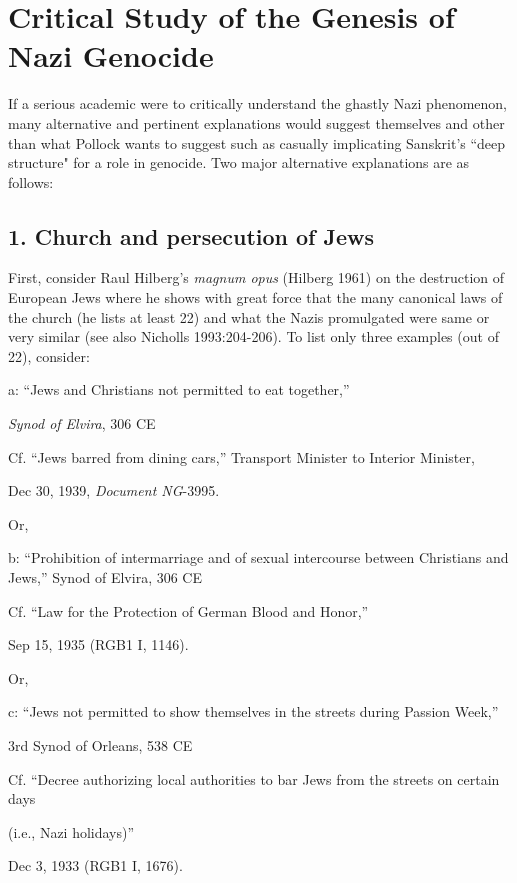 \section*{Critical Study of the Genesis of Nazi Genocide}

If a serious academic were to critically understand the ghastly Nazi phenomenon, many alternative and pertinent explanations would suggest themselves and other than what Pollock wants to suggest such as casually implicating Sanskrit's ``deep structure" for a role in genocide. Two major alternative explanations are as follows:

\subsection*{1. Church and persecution of Jews}
First, consider Raul Hilberg's {\sl magnum opus} (Hilberg 1961) on the destruction of European Jews where he shows with great force that the many canonical laws of the church (he lists at least 22) and what the Nazis promulgated were same or very similar (see also Nicholls 1993:204-206). To list only three examples (out of 22), consider:

a: “Jews and Christians not permitted to eat together,”

{\sl Synod of Elvira}, 306 CE

Cf. “Jews barred from dining cars,” Transport Minister to Interior Minister, 

Dec 30, 1939, {\sl Document NG}-3995. 
\medskip

Or, 

b: “Prohibition of intermarriage and of sexual intercourse between Christians and Jews,” Synod of Elvira, 306 CE 

Cf. “Law for the Protection of German Blood and Honor,” 

Sep 15, 1935 (RGB1 I, 1146).
\medskip

Or,

c: “Jews not permitted to show themselves in the streets during Passion Week,” 

3rd  Synod of Orleans, 538 CE 

Cf. “Decree authorizing local authorities to bar Jews from the streets on certain days

(i.e., Nazi holidays)” 

Dec 3, 1933 (RGB1 I, 1676).

